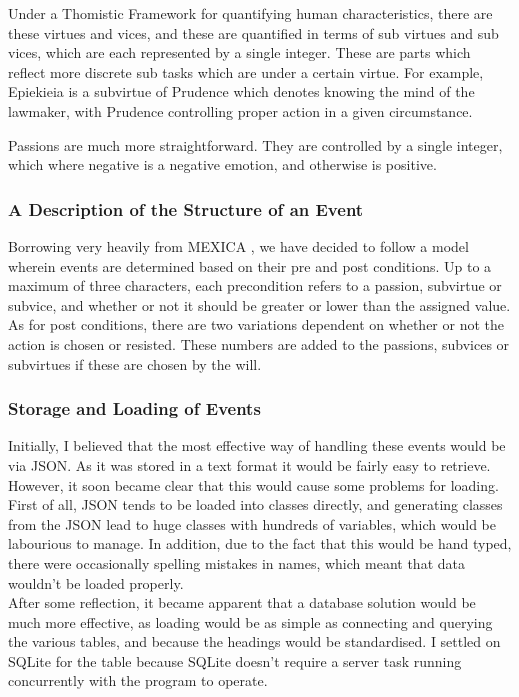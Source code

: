 \documentclass[11pt]{article}
\begin{document}
Under a Thomistic Framework for quantifying human characteristics, there are these virtues and vices, and these are quantified in terms of sub virtues and sub vices, which are each represented by a single integer. These are parts which reflect more discrete sub tasks which are under a certain virtue. For example, Epiekieia is a subvirtue of Prudence which denotes knowing the mind of the lawmaker, with Prudence controlling proper action in a given circumstance.

Passions are much more straightforward. They are controlled by a single integer, which where negative is a negative emotion, and otherwise is positive.

\subsubsection{A Description of the Structure of an Event}
Borrowing very heavily from MEXICA \cite{MEXICA}, we have decided to follow a model wherein events are determined based on their pre and post conditions. Up to a maximum of three characters, each precondition refers to a passion, subvirtue or subvice, and whether or not it should be greater or lower than the assigned value. As for post conditions, there are two variations dependent on whether or not the action is chosen or resisted. These numbers are added to the passions, subvices or subvirtues if these are chosen by the will. 

\subsubsection{Storage and Loading of Events} 
Initially, I believed that the most effective way of handling these events would be via JSON. As it was stored in a text format it would be fairly easy to retrieve. However, it soon became clear that this would cause some problems for loading. First of all, JSON tends to be loaded into classes directly, and generating classes from the JSON lead to huge classes with hundreds of variables, which would be labourious to manage. In addition, due to the fact that this would be hand typed, there were occasionally spelling mistakes in names, which meant that data wouldn't be loaded properly.\\

After some reflection, it became apparent that a database solution would be much more effective, as loading would be as simple as connecting and querying the various tables, and because the headings would be standardised. I settled on SQLite for the table because SQLite doesn't require a server task running concurrently with the program to operate.\\
\end{document}
